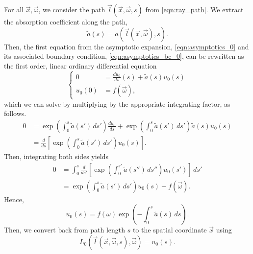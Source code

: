 For all $\vec{x}, \vec{\omega}$, we consider the path $\vec{l}(\vec{x}, \vec{\omega}, s)$ from \eqref{eqn:ray_path}.
We extract the absorption coefficient along the path,
\begin{equation*}
  \tilde{a}(s) = a(\vec{l}(\vec{x}, \vec{\omega}), s).
\end{equation*}
Then, the first equation from the asymptotic expansion, \eqref{eqn:asymptotics_0} and its associated boundary condition, \eqref{eqn:asymptotics_bc_0}, can be rewritten as the first order, linear ordinary differential equation
\begin{equation*}
  \left\{
  \begin{aligned}
  0 &= \frac{du_0}{ds}(s) + \tilde{a}(s) u_0(s) \\
  u_0(0) &= f(\vec{\omega}),
  \end{aligned}
  \right.
\end{equation*}
which we can solve by multiplying by the appropriate integrating factor, as follows.
\begin{align*}
  0 &= \exp\left(\int_0^s \tilde{a}(s')\, ds'\right) \frac{du_0}{ds} + \exp\left(\int_0^s \tilde{a}(s')\, ds'\right) \tilde{a}(s) u_0(s) \\
  &= \frac{d}{ds}\left[\exp\left(\int_0^s \tilde{a}(s')\, ds'\right) u_0(s)\right].
\end{align*}
Then, integrating both sides yields
\begin{align*}
  0 &= \int_0^s \frac{d}{ds'}\left[\exp\left(\int_0^{s'} \tilde{a}(s'')\, ds''\right) u_0(s')\right]\, ds' \\
  &= \exp\left(\int_0^s \tilde{a}(s')\, ds'\right) u_0(s) - f(\vec{\omega}).
\end{align*}
Hence,
\begin{equation}
  u_0(s) = f(\omega) \exp\left(-\int_0^s \tilde{a}(s)\, ds\right).
  \label{eqn:asymptotics_soln_0}
\end{equation}
Then, we convert back from path length $s$ to the spatial coordinate $\vec{x}$ using
\begin{equation*}
  L_0(\vec{l}(\vec{x}, \vec{\omega},s), \vec{\omega}) = u_0(s).
\end{equation*}

